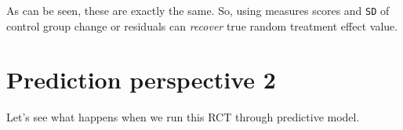 \documentclass[
]{book}
\newenvironment{Shaded}{\begin{snugshade}}{\end{snugshade}}
\newcommand{\CommentTok}[1]{\textcolor[rgb]{0.56,0.35,0.01}{\textit{#1}}}
\newcommand{\DataTypeTok}[1]{\textcolor[rgb]{0.13,0.29,0.53}{#1}}
\newcommand{\DecValTok}[1]{\textcolor[rgb]{0.00,0.00,0.81}{#1}}
\newcommand{\KeywordTok}[1]{\textcolor[rgb]{0.13,0.29,0.53}{\textbf{#1}}}
\newcommand{\NormalTok}[1]{#1}
\newcommand{\OperatorTok}[1]{\textcolor[rgb]{0.81,0.36,0.00}{\textbf{#1}}}
\newcommand{\StringTok}[1]{\textcolor[rgb]{0.31,0.60,0.02}{#1}}
\begin{document}
\begin{Shaded}
\end{Shaded}

As can be seen, these are exactly the same. So, using measures scores and \texttt{SD} of control group change or residuals can \emph{recover} true random treatment effect value.

\hypertarget{prediction-perspective-2}{%
\section{Prediction perspective 2}\label{prediction-perspective-2}}

Let's see what happens when we run this RCT through predictive model.
\end{document}
